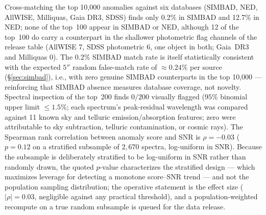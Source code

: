 \documentclass[aps,prd,twocolumn,superscriptaddress,showpacs,preprintnumbers,nofootinbib,longbibliography,floatfix]{revtex4-2}
\begin{document}
Cross-matching the top 10{,}000 anomalies against six databases (SIMBAD, NED, AllWISE, Milliquas, Gaia DR3, SDSS) finds only 0.2\% in SIMBAD and 12.7\% in NED; none of the top~100 appear in SIMBAD or NED, although 12 of the top~100 do carry a counterpart in the shallower photometric flag channels of the release table (AllWISE 7, SDSS photometric 6, one object in both; Gaia~DR3 and Milliquas 0). The 0.2\% SIMBAD match rate is itself statistically consistent with the expected $5''$ random false-match rate of $\approx\!0.24\%$ per source (\S\ref{sec:simbad}), i.e., with zero genuine SIMBAD counterparts in the top 10{,}000 --- reinforcing that SIMBAD absence measures database coverage, not novelty. Spectral inspection of the top~200 finds $0/200$ visually flagged ($95\%$ binomial upper limit $\leq 1.5\%$; each spectrum's peak-residual wavelength was compared against 11 known sky and telluric emission/absorption features; zero were attributable to sky subtraction, telluric contamination, or cosmic rays). The Spearman rank correlation between anomaly score and SNR is $\rho = -0.03$ ($p = 0.12$ on a stratified subsample of $2{,}670$ spectra, log-uniform in SNR). Because the subsample is deliberately stratified to be log-uniform in SNR rather than randomly drawn, the quoted $p$-value characterizes the stratified design --- which maximizes leverage for detecting a monotone score--SNR trend --- and not the population sampling distribution; the operative statement is the effect size ($|\rho| = 0.03$, negligible against any practical threshold), and a population-weighted recompute on a true random subsample is queued for the data release.
\end{document}
